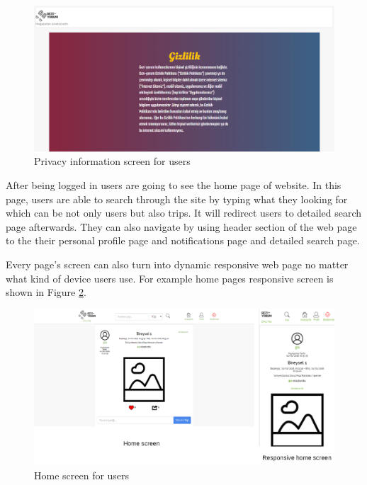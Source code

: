 \begin{figure}[!htbp]
\centering
\includegraphics[width=\textwidth]{projectChapters/images/privacyPage.png}
\caption{Privacy information screen for users}
\label{fig:privacyWeb}
\end{figure}

\newpage

After being logged in users are going to see the home page of website. In this page, users are able to search through the site by typing what they looking for which can be not only users but also trips. It will redirect users to detailed search page afterwards. They can also navigate by using header section of the web page to the their personal profile page and notifications page and detailed search page.


Every page's screen can also turn into dynamic responsive web page no matter what kind of device users use. For example home pages responsive screen is shown in Figure  \ref{fig:homepageWeb}.

\begin{figure}[!htbp]
\centering
\includegraphics[width=\textwidth]{projectChapters/images/homepageWeb.png}
\caption{Home screen for users}
\label{fig:homepageWeb}
\end{figure}

